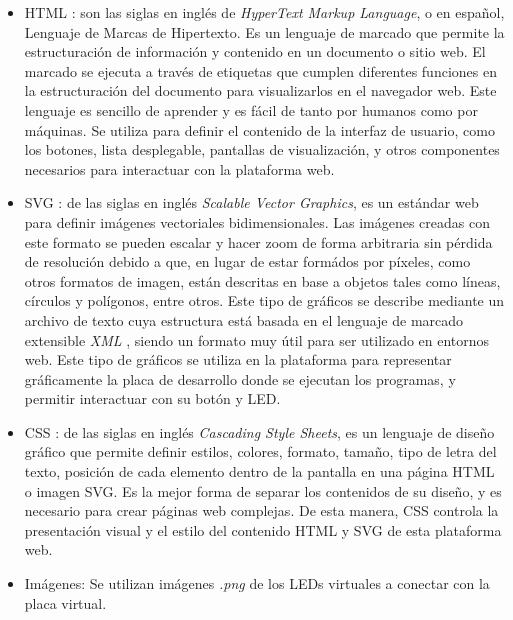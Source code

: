 \begin{itemize}
    \item HTML \citep{HTML}: son las siglas en inglés de \textit{HyperText Markup Language}, o en español, Lenguaje de Marcas de Hipertexto. Es un lenguaje de marcado que permite la estructuración de información y contenido en un documento o sitio web. El marcado se ejecuta a través de etiquetas que cumplen diferentes funciones en la estructuración del documento para visualizarlos en el navegador web.
    Este lenguaje es sencillo de aprender y es fácil de  tanto por humanos como por máquinas. Se utiliza para definir el contenido de la interfaz de usuario, como los botones, lista desplegable, pantallas de visualización, y otros componentes necesarios para interactuar con la plataforma web.

    \item SVG \citep{SVG}: de las siglas en inglés \textit{Scalable Vector Graphics}, es un estándar web para definir imágenes vectoriales bidimensionales. Las imágenes creadas con este formato se pueden escalar y hacer zoom de forma arbitraria sin pérdida de resolución debido a que, en lugar de estar formádos por píxeles, como otros formatos de imagen, están descritas en base a objetos tales como líneas, círculos y polígonos, entre otros. Este tipo de gráficos se describe mediante un archivo de texto cuya estructura está basada en el lenguaje de marcado extensible \textit{XML} \citep{XML}, siendo un formato muy útil para ser utilizado en entornos web. Este tipo de gráficos se utiliza en la plataforma para representar gráficamente la placa de desarrollo donde se ejecutan los programas, y permitir interactuar con su botón y LED.

    \item CSS \citep{CSS}: de las siglas en inglés \textit{Cascading Style Sheets}, es un lenguaje de diseño gráfico que permite definir estilos, colores, formato, tamaño, tipo de letra del texto, posición de cada elemento dentro de la pantalla en una página HTML o imagen SVG. Es la mejor forma de separar los contenidos de su diseño, y es necesario para crear páginas web complejas. De esta manera, CSS controla la presentación visual y el estilo del contenido HTML y SVG de esta plataforma web.

    \item Imágenes: Se utilizan imágenes \textit{.png} de los LEDs virtuales a conectar con la placa virtual.

\end{itemize}

